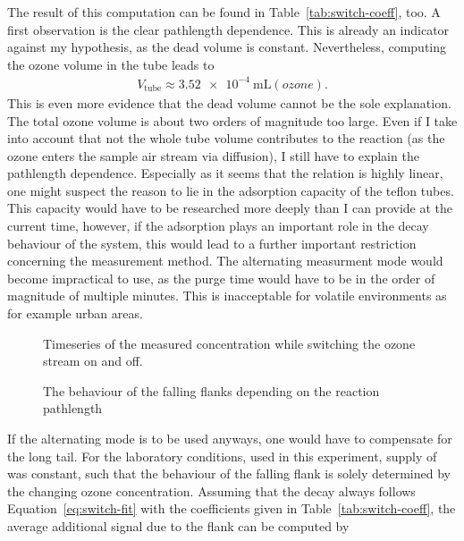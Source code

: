 The result of this computation can be found in
Table~\ref{tab:switch-coeff}, too. A first observation is the clear
pathlength dependence. This is already an indicator against my
hypothesis, as the dead volume is constant. Nevertheless, computing
the ozone volume in the tube leads to
\begin{align*}
  V_{\text{tube}} \approx \SI{3.52e-4}{\milli\liter(ozone)}.
\end{align*}
This is even more evidence that the dead volume cannot be the sole
explanation. The total ozone volume is about two orders of magnitude
too large. Even if I take into account that not the whole tube volume
contributes to the reaction (as the ozone enters the sample air stream
via diffusion), I still have to explain the pathlength
dependence. Especially as it seems that the relation is highly linear,
one might suspect the reason to lie in the adsorption capacity of the
teflon tubes. This capacity would have to be researched more deeply
than I can provide at the current time, however, if the adsorption
plays an important role in the decay behaviour of the system, this
would lead to a further important restriction concerning the
measurement method. The alternating measurment mode would become
impractical to use, as the purge time would have to be in the order of
magnitude of multiple minutes. This is inacceptable for volatile
environments as for example urban areas.

\begin{figure}[htbp]
  \centering
  
  \caption{Timeseries of the measured  concentration while
    switching the ozone stream on and off.}
  \label{fig:switch}
\end{figure}
\begin{figure}[htbp]
  \centering
  
  \caption{The behaviour of the falling flanks depending on the
    reaction pathlength}
  \label{fig:switch-pl}
\end{figure}

If the alternating mode is to be used anyways, one would have to
compensate for the long tail. For the laboratory conditions, used in
this experiment, supply of  was constant,
such that the behaviour of the falling flank is solely determined by
the changing ozone concentration. Assuming that the decay always
follows Equation~\eqref{eq:switch-fit} with the coefficients given in
Table~\ref{tab:switch-coeff}, the average additional
 signal due to the flank can be computed by

